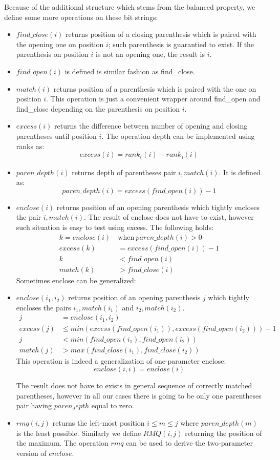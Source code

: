 Because of the additional structure which stems from the balanced property, we define some more operations on these bit strings:
\begin{itemize}
	\item \emph{$find\_close(i)$} returns position of a closing parenthesis which is paired with the opening one on position $i$; such parenthesis is guarantied to exist.
	If the parenthesis on position $i$ is not an opening one, the result is $i$.
	\item \emph{$find\_open(i)$} is defined is similar fashion as find\_close.
	\item \emph{$match(i)$} returns position of a parenthesis which is paired with the one on position $i$.
	This operation is just a convenient wrapper around find\_open and find\_close depending on the parenthesis on position $i$.
	\item \emph{$excess(i)$} returns the difference between number of opening and closing parentheses until position $i$.
	The operation depth can be implemented using ranks as: $$excess(i) = rank_((i) - rank_)(i)$$
	\item \emph{$paren\_depth(i)$} returns depth of parentheses pair $i, match(i)$.
	It is defined as: $$paren\_depth(i) = excess(find\_open(i)) - 1$$
	\item \emph{$enclose(i)$} returns position of an opening parenthesis which tightly encloses the pair $i, match(i)$.
	The result of enclose does not have to exist, however such situation is easy to test using excess.
	The following holds:
	\begin{align*}
		k = enclose(i)\ &\textrm{when}\ paren\_depth(i) > 0\\
		excess(k) &= excess(find\_open(i)) - 1 \\
		k &< find\_open(i) \\
		match(k) &> find\_close(i)
	\end{align*}
	Sometimes enclose can be generalized:
	\item \emph{$enclose(i_1, i_2)$} returns position of an opening parenthesis $j$ which tightly encloses the pairs $i_1, match(i_1)$ and $i_2, match(i_2)$.
	\begin{align*}
	j &= enclose(i_1, i_2)\\
	excess(j) &\le min(excess(find\_open(i_1)), excess(find\_open(i_2))) - 1 \\
	j &< min(find\_open(i_1), find\_open(i_2)) \\
	match(j) &> max(find\_close(i_1), find\_close(i_2))
	\end{align*}
	This operation is indeed a generalization of one-parameter enclose:
	$$enclose(i, i) = enclose(i)$$
	
	The result does not have to exists in general sequence of correctly matched parentheses, however in all our cases there is going to be only one parentheses pair having $paren_depth$ equal to zero.
	\item \emph{$rmq(i, j)$} returns the left-most position $i \le m \le j$ where $paren\_depth(m)$ is the least possible.
	Similarly we define \emph{$RMQ(i, j)$} returning the position of the maximum.
	The operation $rmq$ can be used to derive the two-parameter version of $enclose$.
\end{itemize}

